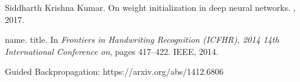 \documentclass{article}
\begin{document}
  


\begin{thebibliography}{1}

Siddharth Krishna Kumar.
\newblock On weight initialization in deep neural networks.
, 2017.

name.
\newblock title.
\newblock In {\em Frontiers in Handwriting Recognition (ICFHR), 2014 14th
  International Conference on}, pages 417--422. IEEE, 2014.

Guided Backpropagation: https://arxiv.org/abs/1412.6806

\end{thebibliography}
\end{document}
